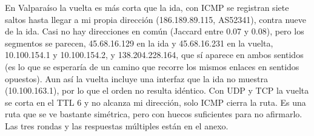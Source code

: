 En Valparaíso la vuelta es más corta que la ida, con ICMP se registran siete saltos hasta llegar a mi propia dirección (186.189.89.115, AS52341), contra nueve de la ida. Casi no hay direcciones en común (Jaccard entre 0.07 y 0.08), pero los segmentos se parecen, 45.68.16.129 en la ida y 45.68.16.231 en la vuelta, 10.100.154.1 y 10.100.154.2, y 138.204.228.164, que sí aparece en ambos sentidos (es lo que se esperaría de un camino que recorre los mismos enlaces en sentidos opuestos). Aun así la vuelta incluye una interfaz que la ida no muestra (10.100.163.1), por lo que el orden no resulta idéntico. Con UDP y TCP la vuelta se corta en el TTL 6 y no alcanza mi dirección, solo ICMP cierra la ruta. Es una ruta que se ve bastante simétrica, pero con huecos suficientes para no afirmarlo. Las tres rondas y las respuestas múltiples están en el anexo.


